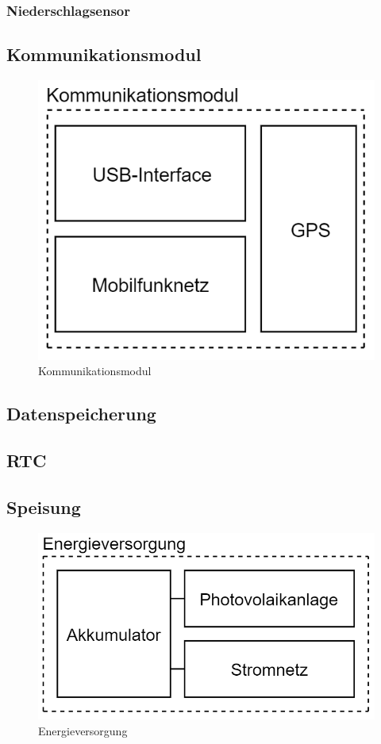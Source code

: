 \subsubsection{Niederschlagsensor}


\newpage
\subsection{Kommunikationsmodul}
\begin{figure}[h]
\centering
\includegraphics[scale=0.7]{graphics/Kommunikationsmodul.PNG}
\caption{Kommunikationsmodul}
\end{figure}

\newpage
\subsection{Datenspeicherung}

\newpage
\subsection{RTC}

\newpage
\subsection{Speisung}
\begin{figure}[h]
\centering
\includegraphics[scale=0.6]{graphics/Energieversorgung.PNG}
\caption{Energieversorgung}
\end{figure}
